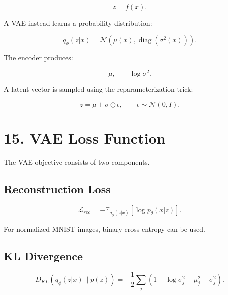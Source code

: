 \documentclass[10pt]{article}
\begin{document}
\[
z=f(x).
\]

A VAE instead learns a probability distribution:

\[
q_{\phi}(z|x)
=
\mathcal{N}
\left(
\mu(x),
\operatorname{diag}(\sigma^2(x))
\right).
\]

The encoder produces:

\[
\mu,\qquad \log\sigma^2.
\]

A latent vector is sampled using the reparameterization trick:

\[
z=\mu+\sigma\odot\epsilon,
\qquad
\epsilon\sim\mathcal{N}(0,I).
\]

\begin{center}
\end{center}

\section*{15. VAE Loss Function}

The VAE objective consists of two components.

\subsection*{Reconstruction Loss}

\[
\mathcal{L}_{rec}
=
-\mathbb{E}_{q_{\phi}(z|x)}
[\log p_{\theta}(x|z)].
\]

For normalized MNIST images, binary cross-entropy can be used.

\subsection*{KL Divergence}

\[
D_{KL}
\left(
q_{\phi}(z|x)\parallel p(z)
\right)
=
-\frac{1}{2}
\sum_j
\left(
1+\log\sigma_j^2-\mu_j^2-\sigma_j^2
\right).
\]
\end{document}
